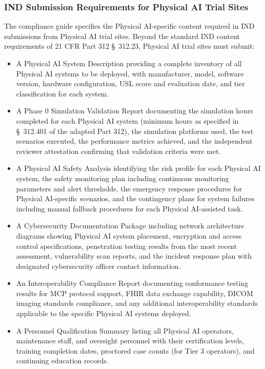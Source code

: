 \subsubsection{IND Submission Requirements for Physical AI Trial Sites}

The compliance guide specifies the Physical AI-specific content required in IND
submissions from Physical AI trial sites. Beyond the standard IND content
requirements of 21 CFR Part 312 \S~312.23, Physical AI trial sites must submit:

\begin{itemize}
    \item A Physical AI System Description providing a complete inventory of
    all Physical AI systems to be deployed, with manufacturer, model, software
    version, hardware configuration, USL score and evaluation date, and tier
    classification for each system.

    \item A Phase 0 Simulation Validation Report documenting the simulation
    hours completed for each Physical AI system (minimum hours as specified in
    \S~312.401 of the adapted Part 312), the simulation platforms used, the
    test scenarios executed, the performance metrics achieved, and the
    independent reviewer attestation confirming that validation criteria were
    met.

    \item A Physical AI Safety Analysis identifying the risk profile for each
    Physical AI system, the safety monitoring plan including continuous
    monitoring parameters and alert thresholds, the emergency response
    procedures for Physical AI-specific scenarios, and the contingency plans
    for system failures including manual fallback procedures for each
    Physical AI-assisted task.

    \item A Cybersecurity Documentation Package including network architecture
    diagrams showing Physical AI system placement, encryption and access
    control specifications, penetration testing results from the most recent
    assessment, vulnerability scan reports, and the incident response plan
    with designated cybersecurity officer contact information.

    \item An Interoperability Compliance Report documenting conformance testing
    results for MCP protocol support, FHIR data exchange capability, DICOM
    imaging standards compliance, and any additional interoperability standards
    applicable to the specific Physical AI systems deployed.

    \item A Personnel Qualification Summary listing all Physical AI operators,
    maintenance staff, and oversight personnel with their certification levels,
    training completion dates, proctored case counts (for Tier 3 operators),
    and continuing education records.
\end{itemize}

